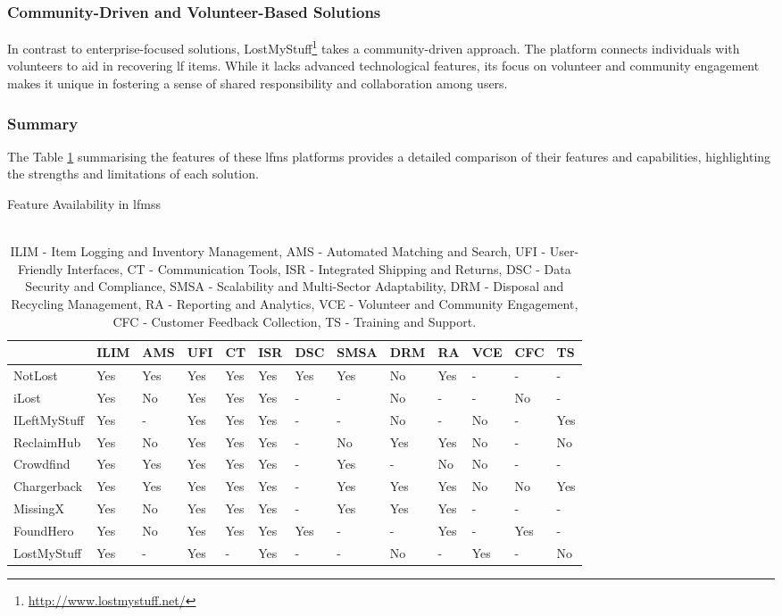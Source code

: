 \subsubsection{Community-Driven and Volunteer-Based Solutions} \label{subsubsec:community-driven-solutions}

In contrast to enterprise-focused solutions, LostMyStuff\footnote{\url{http://www.lostmystuff.net/}} takes a community-driven approach. The platform connects individuals with volunteers to aid in recovering \ac{lf} items. While it lacks advanced technological features, its focus on volunteer and community engagement makes it unique in fostering a sense of shared responsibility and collaboration among users.

\subsubsection{Summary} \label{subsubsec:lfms_summary}

The Table \ref{tab:lfms_features} summarising the features of these \ac{lfms} platforms provides a detailed comparison of their features and capabilities, highlighting the strengths and limitations of each solution.

\begin{table}[!htb]
\centering
\caption{Feature Availability in \acl{lfms}s}
\begin{tabular}{lllllllllllll}
    \toprule
    {} & ILIM & AMS & UFI & CT & ISR & DSC & SMSA & DRM & RA & VCE & CFC & TS \\
    \midrule
    NotLost & Yes & Yes & Yes & Yes & Yes & Yes & Yes & No & Yes & - & - & - \\
    iLost & Yes & No & Yes & Yes & Yes & - & - & No & - & - & No & - \\
    ILeftMyStuff & Yes & - & Yes & Yes & Yes & - & - & No & - & No & - & Yes \\
    ReclaimHub & Yes & No & Yes & Yes & Yes & - & No & Yes & Yes & No & - & No \\
    Crowdfind & Yes & Yes & Yes & Yes & Yes & - & Yes & - & No & No & - & - \\
    Chargerback & Yes & Yes & Yes & Yes & Yes & - & Yes & Yes & Yes & No & No & Yes \\
    MissingX & Yes & No & Yes & Yes & Yes & - & Yes & Yes & Yes & - & - & - \\
    FoundHero & Yes & No & Yes & Yes & Yes & Yes & - & - & Yes & - & Yes & - \\
    LostMyStuff & Yes & - & Yes & - & Yes & - & - & No & - & Yes & - & No \\
    \bottomrule
\end{tabular}
\caption*{\\ILIM - Item Logging and Inventory Management, AMS - Automated Matching and Search, UFI - User-Friendly Interfaces, CT - Communication Tools, ISR - Integrated Shipping and Returns, DSC - Data Security and Compliance, SMSA - Scalability and Multi-Sector Adaptability, DRM - Disposal and Recycling Management, RA - Reporting and Analytics, VCE - Volunteer and Community Engagement, CFC - Customer Feedback Collection, TS - Training and Support.}
\label{tab:lfms_features}
\end{table}

